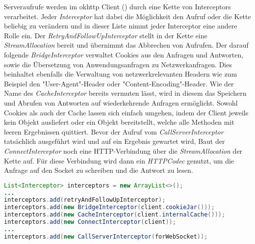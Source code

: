         Serveraufrufe werden im okhttp Client () durch eine Kette von Interceptors verarbeitet. Jeder {\it Interceptor} hat dabei die Möglichkeit den Aufruf oder die Kette beliebig zu verändern und in dieser Liste nimmt jeder Interceptor eine andere Rolle ein. Der {\it RetryAndFollowUpInterceptor} stellt in der Kette eine {\it StreamAllocation} bereit und übernimmt das Abbrechen von Aufrufen. Der darauf folgende {\it BridgeInterceptor} verwaltet Cookies aus den Anfragen und Antworten, sowie die Übersetzung von Anwendungsanfragen zu Netzwerkanfragen. Dies beinhaltet ebenfalls die Verwaltung von netzwerkrelevanten Headern wie zum Beispiel den "User-Agent"-Header oder "Content-Encoding"-Header. Wie der Name des {\it CacheInterceptor} bereits vermuten lässt, wird in diesem das Speichern und Abrufen von Antworten auf wiederkehrende Anfragen ermöglicht. Sowohl Cookies als auch der Cache lassen sich einfach umgehen, indem der Client jeweils kein Objekt ausliefert oder ein Objekt bereitstellt, welche alle Methoden mit leeren Ergebnissen quittiert. Bevor der Aufruf vom {\it CallServerInterceptor} tatsächlich ausgeführt wird und auf ein Ergebnis gewartet wird, Baut der {\it ConnectInterceptor} noch eine HTTP-Verbindung über die {\it StreamAllocation} der Kette auf. Für diese Verbindung wird dann ein {\it HTTPCodec} genutzt, um die Anfrage auf den Socket zu schreiben und die Antwort zu lesen.

        \begin{lstlisting}[frame=bt, label={lst:android:okhttp}, language=Java, caption=Interner Aufbau von okhttp (Clientcode in Java) \cite{okhttpRealCall}]
List<Interceptor> interceptors = new ArrayList<>();
...
interceptors.add(retryAndFollowUpInterceptor);
interceptors.add(new BridgeInterceptor(client.cookieJar()));
interceptors.add(new CacheInterceptor(client.internalCache()));
interceptors.add(new ConnectInterceptor(client));
...
interceptors.add(new CallServerInterceptor(forWebSocket));
        \end{lstlisting}        
        
